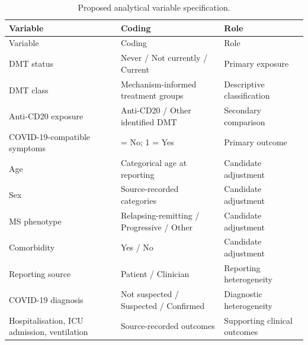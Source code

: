 \documentclass[
  british,
]{article}
\begin{document}
\begin{longtable}[]{@{}
  >{\raggedright\arraybackslash}p{}
  >{\raggedright\arraybackslash}p{}
  >{\raggedright\arraybackslash}p{}@{}}
\caption{Proposed analytical variable specification.}\tabularnewline
\toprule\noalign{}
\begin{minipage}[b]{\linewidth}\raggedright
Variable
\end{minipage} & \begin{minipage}[b]{\linewidth}\raggedright
Coding
\end{minipage} & \begin{minipage}[b]{\linewidth}\raggedright
Role
\end{minipage} \\
\midrule\noalign{}
\endfirsthead
\toprule\noalign{}
\begin{minipage}[b]{\linewidth}\raggedright
Variable
\end{minipage} & \begin{minipage}[b]{\linewidth}\raggedright
Coding
\end{minipage} & \begin{minipage}[b]{\linewidth}\raggedright
Role
\end{minipage} \\
\midrule\noalign{}
\endhead
\bottomrule\noalign{}
\endlastfoot
DMT status & Never / Not currently / Current & Primary exposure \\
DMT class & Mechanism-informed treatment groups & Descriptive
classification \\
Anti-CD20 exposure & Anti-CD20 / Other identified DMT & Secondary
comparison \\
COVID-19-compatible symptoms & 0 = No; 1 = Yes & Primary outcome \\
Age & Categorical age at reporting & Candidate adjustment \\
Sex & Source-recorded categories & Candidate adjustment \\
MS phenotype & Relapsing-remitting / Progressive / Other & Candidate
adjustment \\
Comorbidity & Yes / No & Candidate adjustment \\
Reporting source & Patient / Clinician & Reporting heterogeneity \\
COVID-19 diagnosis & Not suspected / Suspected / Confirmed & Diagnostic
heterogeneity \\
Hospitalisation, ICU admission, ventilation & Source-recorded outcomes &
Supporting clinical outcomes \\
\end{longtable}
\end{document}

